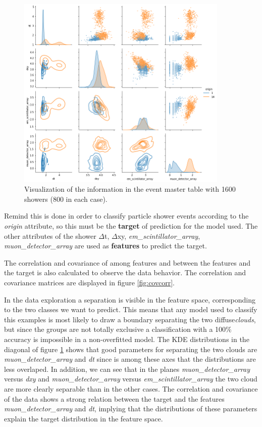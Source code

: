 \documentclass{article}
\begin{document}
\begin{figure}[!h]
    \centering
    \includegraphics[width=0.9\textwidth]{imgs/data_exp.png}
    \caption{Visualization of the information in the event master table with 1600 showers (800 in each case).}
    \label{fig:dataexploration}
\end{figure}



Remind this is done in order to classify particle shower events according to the \emph{origin} attribute, so this must be the \textbf{target} of prediction for the model used. The other attributes of the shower $\Delta$t, $\Delta$xy, \emph{em\_scintillator\_array}, \emph{muon\_detector\_array} are used as \textbf{features} to predict the target.

The correlation and covariance of among features and between the features and the target is also calculated to observe the data behavior. The correlation and covariance matrices are displayed in figure \ref{fig:covcorr}.



In the data exploration a separation is visible in the feature space, corresponding to the two classes we want to predict. This means that any model used to classify this examples is most likely to draw a boundary separating the two diffuse\textit{clouds}, but since the groups are not totally exclusive a classification with a 100\% accuracy is impossible in a non-overfitted model. The KDE distributions in the diagonal of figure \ref{fig:dataexploration} shows that good parameters for separating the two clouds are \emph{muon\_detector\_array} and \emph{dt} since is among these axes that the distributions are less overlaped. In addition, we can see that in the planes  \emph{muon\_detector\_array} versus \emph{dxy} and \emph{muon\_detector\_array} versus \emph{em\_scintillator\_array}  the two cloud are more clearly separable than in the other cases. The correlation and covariance of the data shows a strong relation between the target and the features \emph{muon\_detector\_array} and \emph{dt}, implying that the distributions of these parameters explain the target distribution in the feature space.
\end{document}

